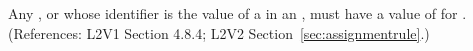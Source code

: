 Any \Compartment, \Species or \Parameter whose identifier is the value of a
  in an \AssignmentRule, must have a value of
 for .  (References: L2V1 Section 4.8.4; L2V2
Section~\ref{sec:assignmentrule}.)
